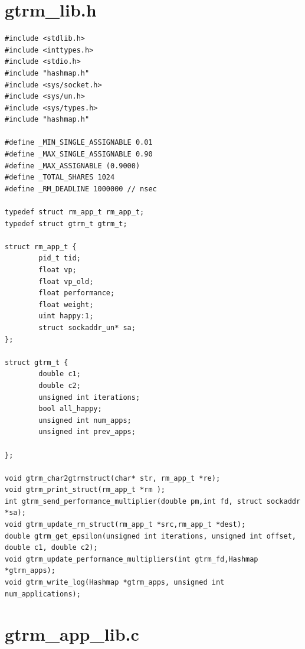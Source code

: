 \documentclass[nobiblatex]{LTHthesis}
\begin{document}
\section{gtrm\_lib.h}
\begin{lstlisting}
#include <stdlib.h>
#include <inttypes.h>
#include <stdio.h>
#include "hashmap.h"
#include <sys/socket.h>
#include <sys/un.h>
#include <sys/types.h>    
#include "hashmap.h"   

#define _MIN_SINGLE_ASSIGNABLE 0.01
#define _MAX_SINGLE_ASSIGNABLE 0.90
#define _MAX_ASSIGNABLE (0.9000)
#define _TOTAL_SHARES 1024
#define _RM_DEADLINE 1000000 // nsec

typedef struct rm_app_t rm_app_t;
typedef struct gtrm_t gtrm_t;

struct rm_app_t {
		pid_t tid;
		float vp;
		float vp_old;
		float performance;
		float weight;
		uint happy:1;
		struct sockaddr_un* sa;
};

struct gtrm_t {
		double c1;
		double c2;
		unsigned int iterations;
		bool all_happy;
		unsigned int num_apps;
		unsigned int prev_apps;
		
};

void gtrm_char2gtrmstruct(char* str, rm_app_t *re);
void gtrm_print_struct(rm_app_t *rm );
int gtrm_send_performance_multiplier(double pm,int fd, struct sockaddr *sa);
void gtrm_update_rm_struct(rm_app_t *src,rm_app_t *dest);
double gtrm_get_epsilon(unsigned int iterations, unsigned int offset, double c1, double c2);
void gtrm_update_performance_multipliers(int gtrm_fd,Hashmap *gtrm_apps);
void gtrm_write_log(Hashmap *gtrm_apps, unsigned int num_applications);
\end{lstlisting}

\section{gtrm\_app\_lib.c}
\end{document}
